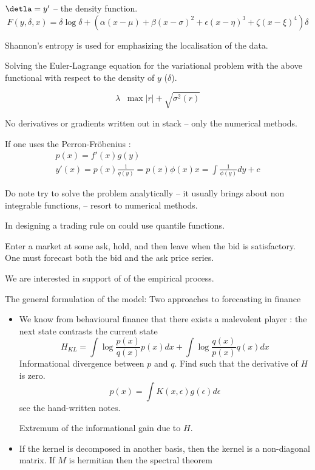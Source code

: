 \documentclass[a4paper]{article}
\newcommand{\brac}[1]{{\left ( #1 \right )}}
\newcommand{\abs}[1]{{\left | #1 \right |}}
\newcommand{\defn}{\mathop{\overset{\Delta}{=}}\nolimits}
\begin{document}
$\detla = y'$ -- the density function.
\[F(y,\delta, x) = \delta \log \delta + \brac{\alpha \brac{x-\mu} + \beta \brac{x-\sigma}^2 + \epsilon \brac{x-\eta}^3 + \zeta \brac{x-\xi}^4} \delta \]

Shannon's entropy is used for emphasizing the localisation of the data.

Solving the Euler-Lagrange equation for the variational problem with the above functional with respect to the density of $y$ ($\delta$).

\[\lambda \defn \max\abs{r} + \sqrt{\sigma^2(r)}\]

No derivatives or gradients written out in stack -- only the numerical methods.


If one uses the Perron-Fr\"obenius :
\begin{align*}
	p(x) = f'(x) g(y)\\
	y'(x) = p(x) \frac{1}{q(y)} = p(x) \phi(x)
	x = \int \frac{1}{\phi(y)} dy + c
\end{align*}

Do note try to solve the problem analytically -- it usually brings about non integrable functions, -- resort to numerical methods.

In designing a trading rule on could use quantile functions.



Enter a market at some ask, hold, and then leave when the bid is satisfactory.
One must forecast both the bid and the ask price series.

We are interested in support of of the empirical process.


The general formulation of the model:
Two approaches to forecasting in finance
\begin{itemize}
	\item We know from behavioural finance that there exists a malevolent player : the next state contrasts the current state
	\[H_{KL} = \int \log\frac{p(x)}{q(x)} p(x) dx + \int \log\frac{q(x)}{p(x)} q(x) dx\]
	Informational divergence between $p$ and $q$. Find such that the derivative of $H$ is zero.
	\[p(x) = \int K(x,\epsilon) g(\epsilon) d\epsilon \]
	see the hand-written notes.

	Extremum of the informational gain due to $H$.

	\item If the kernel is decomposed in another basis, then the kernel is a non-diagonal matrix. If $M$ is hermitian then the spectral theorem 



\end{itemize}
\end{document}

